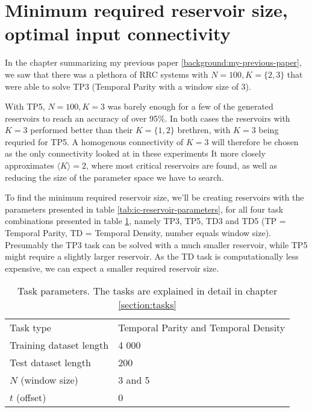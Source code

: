 \section{Minimum required reservoir size, optimal input connectivity}

In the chapter summarizing my previous paper \ref{background:my-previous-paper},
we saw that there was a plethora of RRC systems with $N=100, K=\{2, 3\}$ that were able to solve TP3 (Temporal Parity with a window size of 3).

With TP5, $N=100, K=3$ was barely enough for a few of the generated reservoirs to reach an accuracy of over 95\%.
In both cases the reservoirs with $K=3$ performed better than their $K=\{1, 2\}$ brethren,
with $K=3$ being requried for TP5.
A homogenous connectivity of $K=3$ will therefore be chosen as the only connectivity looked at in these experiments
It more closely approximates $\langle K \rangle = 2 $, where most critical reservoirs are found,
as well as reducing the size of the parameter space we have to search.

To find the minimum required reservoir size,
we'll be creating reservoirs with the parameters presented in table \ref{tab:ic-reservoir-parameters},
for all four task combinations presented in table \ref{tab:tasks},
namely TP3, TP5, TD3 and TD5 (TP = Temporal Parity, TD = Temporal Density, number equals window size).
Presumably the TP3 task can be solved with a much smaller reservoir,
while TP5 might require a slightly larger reservoir.
As the TD task is computationally less expensive,
we can expect a smaller required reservoir size.

\begin{table}[ht]
    \centering
    \caption{Task parameters. The tasks are explained in detail in chapter \ref{section:tasks}}
    \label{tab:tasks}
    \begin{tabular}{ll}
        Task type               & Temporal Parity and Temporal Density \\
        Training dataset length & 4 000                       \\
        Test dataset length     & 200                         \\
        $N$ (window size)       & 3 and 5                     \\
        $t$ (offset)            & 0
    \end{tabular}
\end{table}

